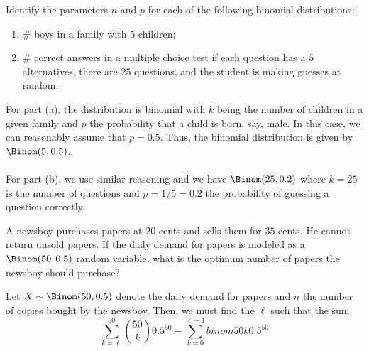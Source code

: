 \begin{problem}[Handout 8, \# 2]
  Identify the parameters \(n\) and \(p\) for each of the following
  binomial distributions:
  \begin{enumerate}[label=(\alph*),noitemsep]
  \item \(\#\) boys in a family with \(5\) children;
  \item \(\#\) correct answers in a multiple choice test if each
    question has a \(5\) alternatives, there are \(25\) questions, and the
    student is making guesses at random.
  \end{enumerate}
\end{problem}
\begin{solution}
  For part (a), the distribution is binomial with \(k\) being the number of
  children in a given family and \(p\) the probability that a child is
  born, say, male. In this case, we can reasonably assume that
  \(p=0.5\). Thus, the binomial distribution is given by
  \(\Binom(5,0.5)\).
  \\\\
  For part (b), we use similar reasoning and we have \(\Binom(25,0.2)\)
  where \(k=25\) is the number of questions and \(p=1/5=0.2\) the
  probability of guessing a question correctly.
\end{solution}
\newpage

\begin{problem}[Handout 8, \# 10]
  A newsboy purchases papers at \(20\) cents and sells them for \(35\)
  cents. He cannot return unsold papers. If the daily demand for papers is
  modeled as a \(\Binom(50,0.5)\) random variable, what is the optimum
  number of papers the newsboy should purchase?
\end{problem}
\begin{solution}
  Let \(X\sim\Binom(50,0.5)\) denote the daily demand for papers and \(n\)
  the number of copies bought by the newsboy. Then, we must find the
  \(\ell\) such that the sum
  \[
    \sum_{k=\ell}^{50}\binom{50}{k}0.5^{50}-\sum_{k=0}^{\ell-1}binom{50}{k}0.5^{50}
  \]
\end{solution}
\newpage

